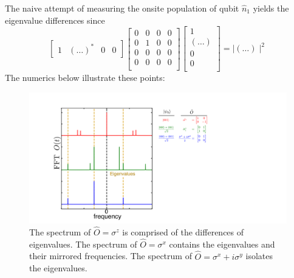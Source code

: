 The naive attempt of measuring the onsite population of qubit $\hat{n}_1$ yields the eigenvalue differences since
\begin{equation}
    \begin{bmatrix}
        1 & (\ldots)^* & 0 & 0
    \end{bmatrix}
    \begin{bmatrix}
        0 & 0 & 0 & 0 \\
        0 & 1 & 0 & 0 \\
        0 & 0 & 0 & 0 \\
        0 & 0 & 0 & 0 \\
    \, \end{bmatrix}
    \begin{bmatrix}
        1 \\
        (\ldots) \\
        0 \\
        0 \\
    \end{bmatrix}
    = \mid (\ldots) \mid^{2}
\end{equation}
The numerics below illustrate these points:
\begin{figure}[h]
    \begin{center}
        \includegraphics[width=150 mm]{./PDF/mbr_numerics_3qubit_o_psi0.pdf}
    \end{center}
    \caption{
    The spectrum of $\hat{O} = \sigma^z$ is comprised of the differences of eigenvalues.
    The spectrum of $\hat{O} = \sigma^x$ contains the eigenvalues and their mirrored frequencies.
    The spectrum of $\hat{O} = \sigma^x + i \sigma^y$ isolates the eigenvalues.
    }
    \label{mbr_peaks_numerics}
\end{figure}

